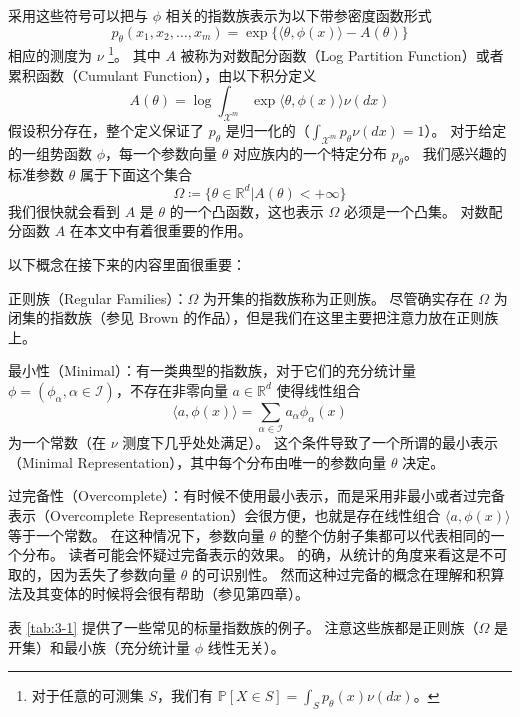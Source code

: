 采用这些符号可以把与 $\phi$ 相关的指数族表示为以下带参密度函数形式
\begin{equation}
    p_{\theta}(x_1, x_2, \dots, x_m) = \exp{\{\langle \theta, \phi(x) \rangle - A(\theta)\}}
\end{equation}
相应的测度为 $\nu$ \footnote{对于任意的可测集 $S$，我们有 $\mathbb{P}[X \in S] = \int_Sp_{\theta}(x)\nu(dx)$。}。
其中 $A$ 被称为对数配分函数（Log Partition Function）或者累积函数（Cumulant Function），由以下积分定义
\begin{equation}
    A(\theta) = \log{\int_{\mathcal{X}^m}\exp{\langle \theta, \phi(x) \rangle}\nu(dx)}
\end{equation}
假设积分存在，整个定义保证了 $p_{\theta}$ 是归一化的（$\int_{\mathcal{X}^m}p_{\theta}\nu(dx) = 1$）。
对于给定的一组势函数 $\phi$，每一个参数向量 $\theta$ 对应族内的一个特定分布 $p_{\theta}$。
我们感兴趣的标准参数 $\theta$ 属于下面这个集合
\begin{equation}
    \Omega \coloneqq \{\theta \in \mathbb{R}^d| A(\theta) < +\infty\}
\end{equation}
我们很快就会看到 $A$ 是 $\theta$ 的一个凸函数，这也表示 $\Omega$ 必须是一个凸集。
对数配分函数 $A$ 在本文中有着很重要的作用。

以下概念在接下来的内容里面很重要：

正则族（Regular Families）：$\Omega$ 为开集的指数族称为正则族。
尽管确实存在 $\Omega$ 为闭集的指数族（参见 Brown 的作品），但是我们在这里主要把注意力放在正则族上。

最小性（Minimal）：有一类典型的指数族，对于它们的充分统计量 $\phi = (\phi_{\alpha}, \alpha \in \mathcal{I})$，不存在非零向量 $a \in \mathbb{R}^d$ 使得线性组合
$$\langle a, \phi(x) \rangle = \sum_{\alpha \in \mathcal{I}}a_{\alpha}\phi_{\alpha}(x)$$
为一个常数（在 $\nu$ 测度下几乎处处满足）。
这个条件导致了一个所谓的最小表示（Minimal Representation），其中每个分布由唯一的参数向量 $\theta$ 决定。

过完备性（Overcomplete）：有时候不使用最小表示，而是采用非最小或者过完备表示（Overcomplete Representation）会很方便，也就是存在线性组合 $\langle a, \phi(x) \rangle$ 等于一个常数。
在这种情况下，参数向量 $\theta$ 的整个仿射子集都可以代表相同的一个分布。
读者可能会怀疑过完备表示的效果。
的确，从统计的角度来看这是不可取的，因为丢失了参数向量 $\theta$ 的可识别性。
然而这种过完备的概念在理解和积算法及其变体的时候将会很有帮助（参见第四章）。

表 \ref{tab:3-1} 提供了一些常见的标量指数族的例子。
注意这些族都是正则族（$\Omega$ 是开集）和最小族（充分统计量 $\phi$ 线性无关）。

